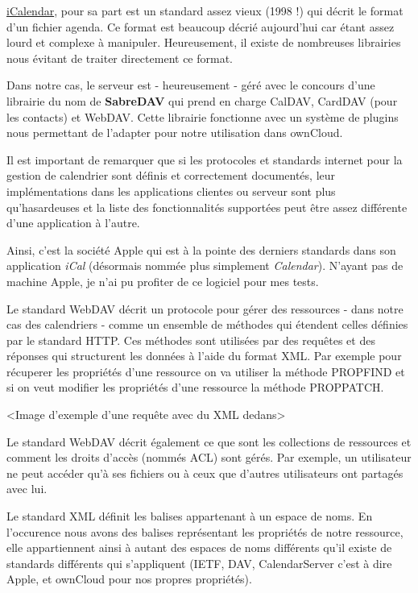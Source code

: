 \documentclass[10pt,a4paper]{report}
\begin{document}
	\href{https://tools.ietf.org/html/rfc2445}{iCalendar}, pour sa part est un standard assez vieux (1998 !) qui décrit le format d'un fichier agenda. Ce format est beaucoup décrié aujourd'hui car étant assez lourd et complexe à manipuler. Heureusement, il existe de nombreuses librairies nous évitant de traiter directement ce format.
	
	Dans notre cas, le serveur est - heureusement - géré avec le concours d'une librairie du nom de \textbf{SabreDAV} qui prend en charge CalDAV, CardDAV (pour les contacts) et WebDAV. Cette librairie fonctionne avec un système de plugins nous permettant de l'adapter pour notre utilisation dans ownCloud.
	
	Il est important de remarquer que si les protocoles et standards internet pour la gestion de calendrier sont définis et correctement documentés, leur implémentations dans les applications clientes ou serveur sont plus qu'hasardeuses et la liste des fonctionnalités supportées peut être assez différente d'une application à l'autre.
		
	Ainsi, c'est la société Apple qui est à la pointe des derniers standards dans son application \textit{iCal} (désormais nommée plus simplement \textit{Calendar}). N'ayant pas de machine Apple, je n'ai pu profiter de ce logiciel pour mes tests.
	
	Le standard WebDAV décrit un protocole pour gérer des ressources - dans notre cas des calendriers - comme un ensemble de méthodes qui étendent celles définies par le standard HTTP. Ces méthodes sont utilisées par des requêtes et des réponses qui structurent les données à l'aide du format XML. Par exemple pour récuperer les propriétés d'une ressource on va utiliser la méthode PROPFIND et si on veut modifier les propriétés d'une ressource la méthode PROPPATCH.
	
	<Image d'exemple d'une requête avec du XML dedans>
	
	Le standard WebDAV décrit également ce que sont les collections de ressources et comment les droits d'accès (nommés ACL) sont gérés. Par exemple, un utilisateur ne peut accéder qu'à ses fichiers ou à ceux que d'autres utilisateurs ont partagés avec lui.
	
	Le standard XML définit les balises appartenant à un espace de noms. En l'occurence nous avons des balises représentant les propriétés de notre ressource, elle appartiennent ainsi à autant des espaces de noms différents qu'il existe de standards différents qui s'appliquent (IETF, DAV, CalendarServer c'est à dire Apple, et ownCloud pour nos propres propriétés).
	
\end{document}
